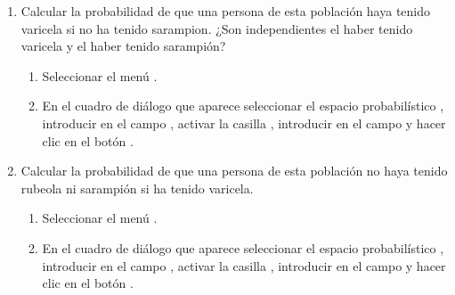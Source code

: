 \begin{enumerate}[leftmargin=*]
\begin{enumerate}
\item Calcular la probabilidad de que una persona de esta población haya tenido varicela si no ha tenido sarampion.
¿Son independientes el haber tenido varicela y el haber tenido sarampión? 
\begin{indicacion}
\begin{enumerate}
\item Seleccionar el menú .
\item En el cuadro de diálogo que aparece seleccionar el espacio probabilístico , introducir
 en el campo , activar la casilla , introducir  en el campo  y hacer clic en el botón .
\end{enumerate}
\end{indicacion} 

\item Calcular la probabilidad de que una persona de esta población no haya tenido rubeola ni sarampión si ha tenido varicela. 
\begin{indicacion}
\begin{enumerate}
\item Seleccionar el menú .
\item En el cuadro de diálogo que aparece seleccionar el espacio probabilístico , introducir
 en el campo , activar la casilla , introducir
 en el campo  y hacer clic en el botón .
\end{enumerate}
\end{indicacion} 
\end{enumerate}


\end{enumerate}
